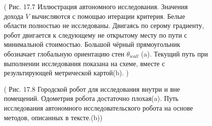 \documentclass[10pt,a4paper]{article}
\begin{document}
\begin{figure}[H]
	\caption{ ( Рис. 17.7 Иллюстрация автономного исследования. Значения дохода $V$ вычисляются с помощью итерации критерия. Белые области полностью не исследованы. Двигаясь по серому градиенту, робот двигается к следующему не открытому месту по пути с минимальной стоимостью. Большой чёрный прямоугольник обозначает глобальную ориентацию стен $\theta_{wall}$ (a). Текущий путь при выполнении исследования показана на схеме, вместе с результирующей метрической картой(b). ) }
	\label{fig:177orig}
\end{figure}

\begin{figure}[H]
	\caption{ ( Рис. 17.8  Городской робот для исследования внутри и вне помещений. Одометрия робота достаточно плохая(a). Путь исследования автономного исследовательского робота на основе методов, описанных в тексте.(b)) }
	\label{fig:178orig}
\end{figure}
\end{document}
